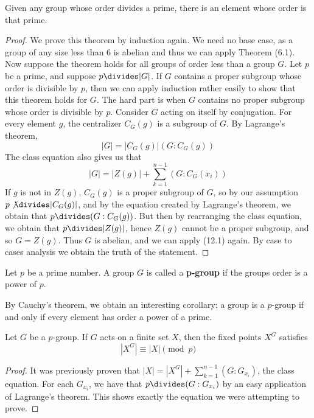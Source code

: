 \begin{theorem} 
    Given any group whose order divides a prime, there is an element whose order is that prime.
\end{theorem}
\begin{proof}
    We prove this theorem by induction again. We need no base case, as a group of any size less than 6 is abelian and thus we can apply Theorem (6.1). Now suppose the theorem holds for all groups of order less than a group $G$. Let $p$ be a prime, and suppose $p \divides |G|$. If $G$ contains a proper subgroup whose order is divisible by $p$, then we can apply induction rather easily to show that this theorem holds for $G$. The hard part is when $G$ contains no proper subgroup whose order is divisible by $p$. Consider $G$ acting on itself by conjugation. For every element $g$, the centralizer $C_G(g)$ is a subgroup of $G$. By Lagrange's theorem,
    \[ |G| = |C_G(g)|(G:C_G(g)) \]
    The class equation also gives us that
    \[ |G| = |Z(g)| + \sum_{k = 1}^{n-1} (G:C_G(x_i)) \]
    If $g$ is not in $Z(g)$, $C_G(g)$ is a proper subgroup of $G$, so by our assumption $p \not \divides |C_G(g)|$, and by the equation created by Lagrange's theorem, we obtain that $p \divides (G:C_G(g))$. But then by rearranging the class equation, we obtain that $p \divides |Z(g)|$, hence $Z(g)$ cannot be a proper subgroup, and so $G = Z(g)$. Thus $G$ is abelian, and we can apply (12.1) again. By case to cases analysis we obtain the truth of the statement.
\end{proof}

Let $p$ be a prime number. A group $G$ is called a {\bf p-group}  if the groups order is a power of $p$.

By Cauchy's theorem, we obtain an interesting corollary: a group is a $p$-group if and only if every element has order a power of a prime.

\begin{lemma}
    Let $G$ be a $p$-group. If $G$ acts on a finite set $X$, then the fixed points $X^G$ satisfies
    \[ |X^G| \equiv |X| \pmod{p} \]
\end{lemma}
\begin{proof}
    It was previously proven that $|X| = |X^G| + \sum_{k=1}^{n-1} (G:G_{x_i})$, the class equation. For each $G_{x_i}$, we have that $p \divides (G:G_{x_i})$ by an easy application of Lagrange's theorem. This shows exactly the equation we were attempting to prove.
\end{proof}

